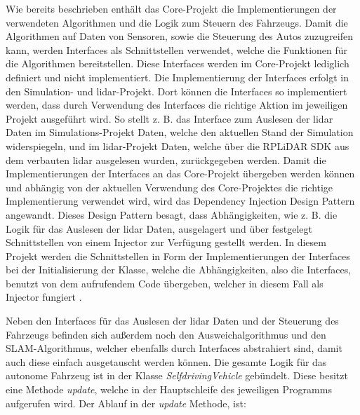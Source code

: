 Wie bereits beschrieben enthält das Core-Projekt die Implementierungen der verwendeten Algorithmen und die Logik zum Steuern des Fahrzeugs. Damit die Algorithmen auf Daten von Sensoren, sowie die Steuerung des Autos zuzugreifen kann, werden Interfaces als Schnittstellen verwendet, welche die Funktionen für die Algorithmen bereitstellen. Diese Interfaces werden im Core-Projekt lediglich definiert und nicht implementiert. Die Implementierung der Interfaces erfolgt in den Simulation- und \ac{lidar}-Projekt. Dort können die Interfaces so implementiert werden, dass durch Verwendung des Interfaces die richtige Aktion im jeweiligen Projekt ausgeführt wird. So stellt z. B. das Interface zum Auslesen der \ac{lidar} Daten im Simulations-Projekt Daten, welche den aktuellen Stand der Simulation widerspiegeln, und im \ac{lidar}-Projekt Daten, welche über die RPLiDAR SDK aus dem verbauten \ac{lidar} ausgelesen wurden, zurückgegeben werden. Damit die Implementierungen der Interfaces an das Core-Projekt übergeben werden können und abhängig von der aktuellen Verwendung des Core-Projektes die richtige Implementierung verwendet wird, wird das Dependency Injection Design Pattern angewandt. Dieses Design Pattern besagt, dass Abhängigkeiten, wie z. B. die Logik für das Auslesen der \ac{lidar} Daten, ausgelagert und über festgelegt Schnittstellen von einem Injector zur Verfügung gestellt werden. In diesem Projekt werden die Schnittstellen in Form der Implementierungen der Interfaces bei der Initialisierung der Klasse, welche die Abhängigkeiten, also die Interfaces, benutzt von dem aufrufendem Code übergeben, welcher in diesem Fall als Injector fungiert \cite{dependencyInjection}. 

Neben den Interfaces für das Auslesen der \ac{lidar} Daten und der Steuerung des Fahrzeugs befinden sich außerdem noch den Ausweichalgorithmus und den SLAM-Algorithmus, welcher ebenfalls durch Interfaces abstrahiert sind, damit auch diese einfach ausgetauscht werden können. Die gesamte Logik für das autonome Fahrzeug ist in der Klasse \textit{SelfdrivingVehicle} gebündelt. Diese besitzt eine Methode \textit{update}, welche in der Hauptschleife des jeweiligen Programms aufgerufen wird. Der Ablauf in der \textit{update} Methode, ist:

